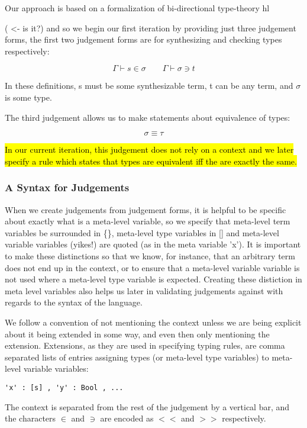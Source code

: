 Our approach is based on a formalization of bi-directional type-theory
\cite{TypesWhoSayNi} hl{( <- is it?) and so we begin our first iteration by providing
just three judgement forms, the first two judgement forms are for
synthesizing and checking types respectively:

$$\boxed{\Gamma \vdash s \in \sigma} \qquad \boxed{\Gamma \vdash \sigma
  \ni t}$$

In these definitions, s must be some synthesizable term, t can be any
term, and $\sigma$ is some type.

The third judgement allows us to make statements about equivalence of
types:

$$\boxed{\sigma \equiv \tau}$$

\hl{In our current iteration, this judgement does not rely on a
  context and we later specify a rule which states that types are
  equivalent iff the are exactly the same.}

\subsubsection{A Syntax for Judgements}

When we create judgements from judgement forms, it is helpful to
be specific about exactly what is a meta-level variable, so we specify
that meta-level term variables be surrounded in \{\}, meta-level type
variables in [] and meta-level variable variables (yikes!) are
quoted (as in the meta variable 'x'). It is important to make these
distinctions so that we know, for instance, that an arbitrary term
does not end up in the context, or to ensure that a meta-level
variable variable is not used where a meta-level type variable is
expected. Creating these distiction in meta level variables also helps
us later in validating judgements against with regards to the syntax
of the language.

We follow a convention of not mentioning the context unless we are
being explicit about it being extended in some way, and even then only
mentioning the extension. Extensions, as they are used in specifying
typing rules, are comma separated lists of entries assigning types (or
meta-level type variables) to meta-level variable variables: 

\begin{verbatim}
'x' : [s] , 'y' : Bool , ...
\end{verbatim}

The context is separated from the rest of the judgement by a vertical
bar, and the characters $\in$ and $\ni$ are encoded as $<<$ and $>>$
respectively.

}
